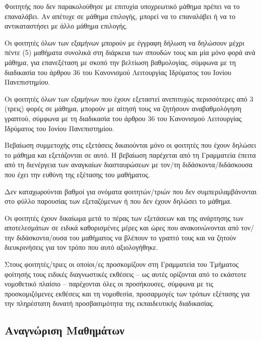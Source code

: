 Φοιτητής που δεν παρακολούθησε με επιτυχία υποχρεωτικό μάθημα πρέπει να
το επαναλάβει. Αν απέτυχε σε μάθημα επιλογής, μπορεί να το επαναλάβει ή
να το αντικαταστήσει με άλλο μάθημα επιλογής.

Οι φοιτητές όλων των εξαμήνων μπορούν με έγγραφη δήλωση να δηλώσουν
μέχρι πέντε (5) μαθήματα συνολικά στη διάρκεια των σπουδών τους και μία
μόνο φορά ανά μάθημα, για επανεξέταση με σκοπό την βελτίωση βαθμολογίας,
σύμφωνα με τη διαδικασία του άρθρου 36 του Κανονισμού Λειτουργίας
Ιδρύματος του Ιονίου Πανεπιστημίου.

Οι φοιτητές όλων των εξαμήνων που έχουν εξεταστεί ανεπιτυχώς
περισσότερες από 3 (τρεις) φορές σε μάθημα, μπορούν με αίτησή τους να
ζητήσουν αναβαθμολόγηση γραπτού, σύμφωνα με τη διαδικασία του άρθρου 36
του Κανονισμού Λειτουργίας Ιδρύματος του Ιονίου Πανεπιστημίου.

Βεβαίωση συμμετοχής στις εξετάσεις δικαιούνται μόνο οι φοιτητές που
έχουν δηλώσει το μάθημα και εξετάζονται σε αυτό. Η βεβαίωση παρέχεται
από τη Γραμματεία έπειτα από τη διενέργεια των αναγκαίων διασταυρώσεων
με τον/τη διδάσκοντα/διδάσκουσα που έχει την ευθύνη της εξέτασης του
μαθήματος.

Δεν καταχωρούνται βαθμοί για ονόματα φοιτητών/τριών που δεν
συμπεριλαμβάνονται στο φύλλο παρουσίας των εξεταζόμενων ή που δεν έχουν
δηλώσει το μάθημα.

Οι φοιτητές έχουν δικαίωμα μετά το πέρας των εξετάσεων και της ανάρτησης
των αποτελεσμάτων σε ειδικά καθορισμένες μέρες και ώρες που
ανακοινώνονται από τον/την διδάσκοντα/ουσα του μαθήματος να βλέπουν το
γραπτό τους και να ζητούν διευκρινήσεις για τον τρόπο που αυτό
αξιολογήθηκε.

Στους φοιτητές/τριες οι οποίοι/ες προσκομίζουν στη Γραμματεία του
Τμήματος φοίτησής τους ειδικές διαγνωστικές εκθέσεις -- ως αυτές
ορίζονται από το εκάστοτε νομοθετικό πλαίσιο -- παρέχονται όλες οι
προσήκουσες, σύμφωνα με τις προσκομιζόμενες εκθέσεις και τη νομοθεσία,
προσαρμογές των τρόπων εξέτασης για την πληρέστατη δυνατή προσβασιμότητα
της εκπαιδευτικής διαδικασίας.

\hypertarget{ux3b1ux3bdux3b1ux3b3ux3bdux3ceux3c1ux3b9ux3c3ux3b7-ux3bcux3b1ux3b8ux3b7ux3bcux3acux3c4ux3c9ux3bd}{%
\subsection{Αναγνώριση
Μαθημάτων}\label{ux3b1ux3bdux3b1ux3b3ux3bdux3ceux3c1ux3b9ux3c3ux3b7-ux3bcux3b1ux3b8ux3b7ux3bcux3acux3c4ux3c9ux3bd}}


